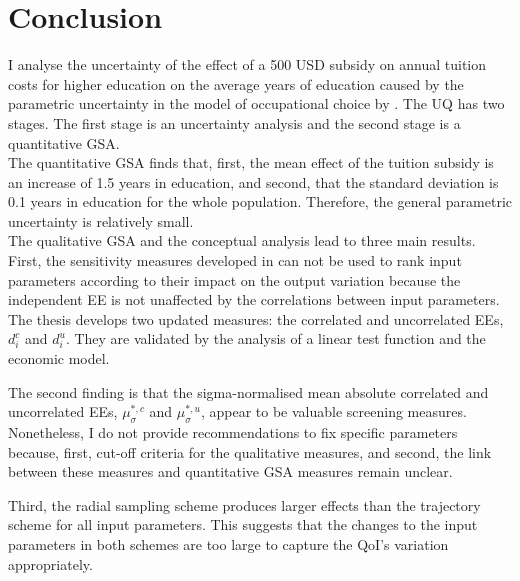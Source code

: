 \section{Conclusion}
\thispagestyle{plain}  %

\noindent
I analyse the uncertainty of the effect of a 500 USD subsidy on annual tuition costs for higher education on the average years of education caused by the parametric uncertainty in the model of occupational choice by \cite{Keane.1994}. The UQ has two stages. The first stage is an uncertainty analysis and the second stage is a quantitative GSA.\\

\noindent
The quantitative GSA finds that, first, the mean effect of the tuition subsidy is an increase of 1.5 years in education, and second, that the standard deviation is 0.1 years in education for the whole population. Therefore, the general parametric uncertainty is relatively small.\\

\noindent
The qualitative GSA and the conceptual analysis lead to three main results.
First, the sensitivity measures developed in \cite{ge2017extending} can not be used to rank input parameters according to their impact on the output variation because the independent EE is not unaffected by the correlations between input parameters. The thesis develops two updated measures: the correlated and uncorrelated EEs, $d_i^{c}$ and $d_i^{u}$. They are validated by the analysis of a linear test function and the economic model.

The second finding is that the sigma-normalised mean absolute correlated and uncorrelated EEs, $\mu^{*,c}_{\sigma}$ and $\mu^{*,u}_{\sigma}$, appear to be valuable screening measures. Nonetheless, I do not provide recommendations to fix specific parameters because, first, cut-off criteria for the qualitative measures, and second, the link between these measures and quantitative GSA measures remain unclear.

Third, the radial sampling scheme produces larger effects than the trajectory scheme for all input parameters. This suggests that the changes to the input parameters in both schemes are too large to capture the QoI's variation appropriately.